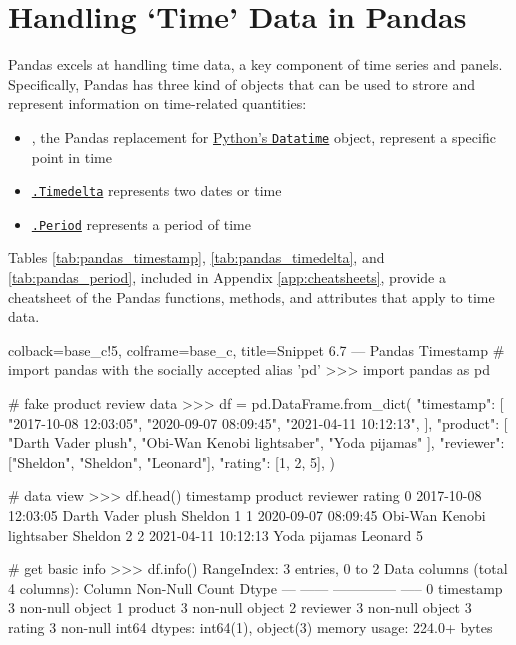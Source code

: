 \documentclass[a4paper,11pt]{book}
\numberwithin{figure}{chapter}
\numberwithin{table}{chapter}
\newcommand{\question}[1]{%
    \begin{tcolorbox}[colback=comp_c!10,colframe=comp_c,sidebyside align=top,width=\linewidth,before skip=1ex]
        #1
    \end{tcolorbox}
    \switchcolumn%
}
\newcommand{\note}[1]{%
    \begin{tcolorbox}[colback=white!0,colframe=white!10,width=\linewidth,before skip=1ex]
        #1
    \end{tcolorbox}
}
\begin{document}
\section{Handling `Time' Data in Pandas}

\begin{paracol}{2}
	\question{\raggedright }
	\note{Pandas excels at handling time data, a key component of time series and panels. Specifically, Pandas has three kind of objects that can be used to strore and represent information on time-related quantities:

	\begin{itemize}
		\item \href{https://pandas.pydata.org/docs/reference/api/pandas.Timestamp.html}{\textt{.Timestamp}}, the Pandas replacement for \href{https://docs.python.org/3/library/datetime.html}{Python's \texttt{Datatime}} object, represent a specific point in time 
		\item \href{https://pandas.pydata.org/docs/reference/api/pandas.Timedelta.html}{\texttt{.Timedelta}} represents two dates or time
		\item \href{https://pandas.pydata.org/docs/reference/api/pandas.Period.html}{\texttt{.Period}} represents a period of time
	\end{itemize}

	Tables \ref{tab:pandas_timestamp}, \ref{tab:pandas_timedelta}, and \ref{tab:pandas_period}, included in Appendix \ref{app:cheatsheets}, provide a cheatsheet of the Pandas functions, methods, and attributes that apply to time data.
	}
\end{paracol}

\begin{pythoncode}[linenos=True]{colback=base_c!5, colframe=base_c, title=\sffamily Snippet 6.7 --- Pandas Timestamp}
# import pandas with the socially accepted alias 'pd'
>>> import pandas as pd

# fake product review data
>>> df = pd.DataFrame.from\_dict(
        {
            "timestamp": [
                "2017-10-08 12:03:05",
                "2020-09-07 08:09:45",
                "2021-04-11 10:12:13",
            ],
            "product": [
		"Darth Vader plush",
		"Obi-Wan Kenobi lightsaber",
		"Yoda pijamas"
       ],
            "reviewer": ["Sheldon", "Sheldon", "Leonard"],
            "rating": [1, 2, 5],
        }
    )

# data view
>>> df.head()
             timestamp                    product reviewer  rating
0  2017-10-08 12:03:05          Darth Vader plush  Sheldon       1
1  2020-09-07 08:09:45  Obi-Wan Kenobi lightsaber  Sheldon       2
2  2021-04-11 10:12:13               Yoda pijamas  Leonard       5

# get basic info
>>> df.info()
RangeIndex: 3 entries, 0 to 2
Data columns (total 4 columns):
     Column     Non-Null Count  Dtype 
---  ------     --------------  ----- 
 0   timestamp  3 non-null      object
 1   product    3 non-null      object
 2   reviewer   3 non-null      object
 3   rating     3 non-null      int64 
dtypes: int64(1), object(3)
memory usage: 224.0+ bytes

\end{pythoncode}
\end{document}
